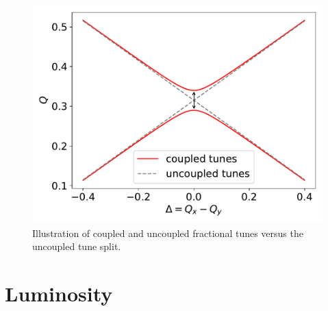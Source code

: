 \begin{figure}[!htb]
    \begin{center}
    \includegraphics[width = 0.9\linewidth]{Figures/Chapter2/tune_perturbation.pdf}
    \caption{Illustration of coupled and uncoupled fractional tunes versus the uncoupled tune split.}
    \label{figure:closest_tune_approach}
    \end{center}
\end{figure}


\section{Luminosity}

